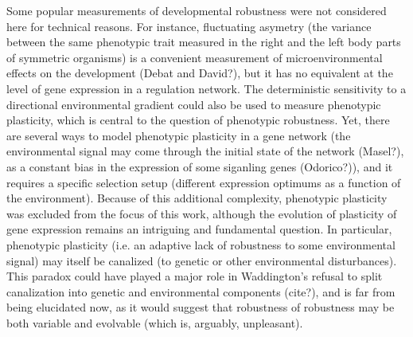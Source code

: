 \documentclass[10pt,a4paper]{article}
\begin{document}
Some popular measurements of developmental robustness were not considered here for technical reasons. For instance, fluctuating asymetry (the variance between the same phenotypic trait measured in the right and the left body parts of symmetric organisms) is a convenient measurement of microenvironmental effects on the development (Debat and David?), but it has no equivalent at the level of gene expression in a regulation network. The deterministic sensitivity to a directional environmental gradient could also be used to measure phenotypic plasticity, which is central to the question of phenotypic robustness. Yet, there are several ways to model phenotypic plasticity in a gene network (the environmental signal may come through the initial state of the network (Masel?), as a constant bias in the expression of some siganling genes (Odorico?)), and it requires a specific selection setup (different expression optimums as a function of the environment). Because of this additional complexity, phenotypic plasticity was excluded from the focus of this work, although the evolution of plasticity of gene expression remains an intriguing and fundamental question. In particular, phenotypic plasticity (i.e. an adaptive lack of robustness to some environmental signal) may itself be canalized (to genetic or other environmental disturbances). This paradox could have played a major role in Waddington's refusal to split canalization into genetic and environmental components (cite?), and is far from being elucidated now, as it would suggest that robustness of robustness may be both variable and evolvable (which is, arguably, unpleasant).  



\printbibliography




\clearpage
\end{document}
